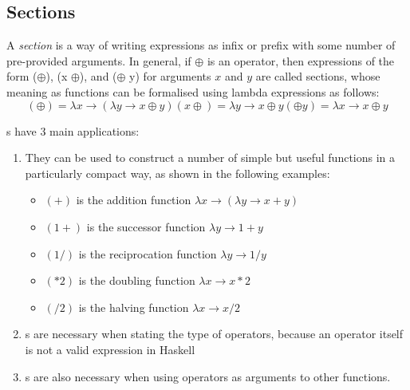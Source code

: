 \subsection{Sections}\label{subsec:Sections}
\begin{definition}[Section]\label{def:Section}
  A \emph{section} is a way of writing expressions as infix or prefix with some number of pre-provided arguments.
  In general, if $\oplus$ is an operator, then expressions of the form ($\oplus$), (x $\oplus$), and ($\oplus$ y) for arguments $x$ and $y$ are called sections, whose meaning as functions can be formalised using lambda expressions as follows:
  \begin{subequations}\label{eq:Section}
    \begin{equation}\label{subeq:Section_No_Params}
      (\oplus) = \lambda x \rightarrow (\lambda y \rightarrow x \oplus y)
    \end{equation}
    \begin{equation}\label{subeq:Section_First_Param}
      (x \oplus) = \lambda y \rightarrow x \oplus y
    \end{equation}
    \begin{equation}\label{subeq:Section_Second_Param}
      (\oplus y) = \lambda x \rightarrow x \oplus y
    \end{equation}
  \end{subequations}
\end{definition}

s have 3 main applications:
\begin{enumerate}[noitemsep]
\item They can be used to construct a number of simple but useful functions in a particularly compact way, as shown in the following examples:
  \begin{itemize}[noitemsep]
  \item $(+)$ is the addition function $\lambda x \rightarrow (\lambda y \rightarrow x + y )$
  \item $(1+)$ is the successor function $\lambda y \rightarrow 1 + y$
  \item $(1/)$ is the reciprocation function $\lambda y \rightarrow 1 / y$
  \item $(*2)$ is the doubling function $\lambda x \rightarrow x * 2$
  \item $(/2)$ is the halving function $\lambda x \rightarrow x / 2$
\end{itemize}
\item {}s are necessary when stating the type of operators, because an operator itself is not a valid expression in Haskell
\item {}s are also necessary when using operators as arguments to other functions.
\end{enumerate}


